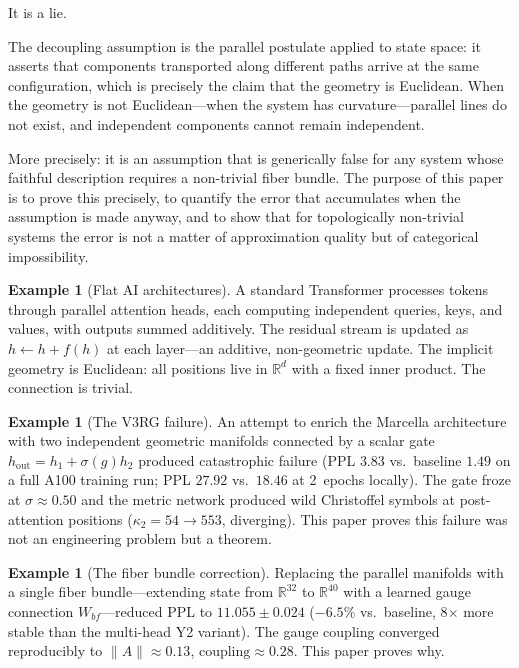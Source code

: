 \documentclass[12pt]{amsart}
\theoremstyle{plain}
\theoremstyle{definition}
\newtheorem{example}[theorem]{Example}
\newcommand{\R}{\mathbb{R}}
\begin{document}
It is a lie.

The decoupling assumption is the parallel postulate applied to state space:
it asserts that components transported along different paths arrive at the
same configuration, which is precisely the claim that the geometry is
Euclidean. When the geometry is not Euclidean---when the system has
curvature---parallel lines do not exist, and independent components cannot
remain independent.

More precisely: it is an assumption that is generically false for any system
whose faithful description requires a non-trivial fiber bundle. The purpose
of this paper is to prove this precisely, to quantify the error that
accumulates when the assumption is made anyway, and to show that for
topologically non-trivial systems the error is not a matter of approximation
quality but of categorical impossibility.

\begin{example}[Flat AI architectures]
A standard Transformer processes tokens through parallel attention heads,
each computing independent queries, keys, and values, with outputs summed
additively. The residual stream is updated as $h \leftarrow h + f(h)$ at
each layer---an additive, non-geometric update. The implicit geometry is
Euclidean: all positions live in $\R^d$ with a fixed inner product. The
connection is trivial.
\end{example}

\begin{example}[The V3RG failure]
An attempt to enrich the Marcella architecture with two independent geometric
manifolds connected by a scalar gate $h_{\text{out}} = h_1 + \sigma(g)h_2$
produced catastrophic failure (PPL $3.83$ vs.\ baseline $1.49$ on a full
A100 training run; PPL $27.92$ vs.\ $18.46$ at 2~epochs locally). The gate
froze at $\sigma \approx 0.50$ and the metric network produced wild
Christoffel symbols at post-attention positions ($\kappa_2 = 54 \to 553$,
diverging). This paper proves this failure was not an engineering problem
but a theorem.
\end{example}

\begin{example}[The fiber bundle correction]
Replacing the parallel manifolds with a single fiber bundle---extending
state from $\R^{32}$ to $\R^{40}$ with a learned gauge connection
$W_{bf}$---reduced PPL to $11.055 \pm 0.024$ ($-6.5\%$ vs.\ baseline,
8$\times$ more stable than the multi-head Y2 variant). The gauge coupling
converged reproducibly to $\|A\| \approx 0.13$, $\text{coupling} \approx
0.28$. This paper proves why.
\end{example}
\end{document}
